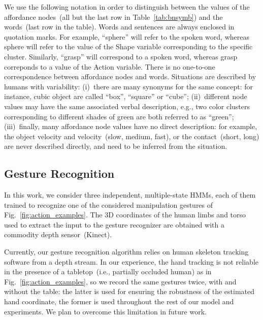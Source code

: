 We use the following notation in order to distinguish between the values of the affordance nodes~(all but the last row in Table~\ref{tab:bnsymb}) and the words~(last row in the table).
Words and sentences are always enclosed in quotation marks.
For example, ``sphere'' will refer to the spoken word, whereas sphere will refer to the value of the Shape variable corresponding to the specific cluster.
Similarly, ``grasp'' will correspond to a spoken word, whereas grasp correponds to a value of the Action variable.
There is no one-to-one correspondence between affordance nodes and words.
Situations are described by humans with variability:
(i)~there are many synonyms for the same concept: for instance, cubic object are called ``box'', ``square'' or ``cube'';
(ii)~different node values may have the same associated verbal description, e.g., two color clusters corresponding to different shades of green are both referred to as ``green'';
(iii)~finally, many affordance node values have no direct description: for example, the object velocity and \objecthand{} velocity~(slow, medium, fast), or the \objecthand{} contact~(short, long) are never described directly, and need to be inferred from the situation.

\subsection{Gesture Recognition}
\label{sec:experimental_settings:gesture_recognition}
In this work, we consider three independent, multiple-state \aclp{HMM}, each of them trained to recognize one of the considered manipulation gestures of  Fig.~\ref{fig:action_examples}.
The 3D coordinates of the human limbs and torso used to extract the input to the gesture recognizer are obtained with a commodity depth sensor~(Kinect).

Currently, our gesture recognition algorithm relies on human skeleton tracking software from a depth stream.
In our experience, the hand tracking is not reliable in the presence of a tabletop~(i.e., partially occluded human) as in Fig.~\ref{fig:action_examples}, so we record the same gestures twice, with and without the table: the latter is used for ensuring the robustness of the estimated hand coordinate, the former is used throughout the rest of our model and experiments.
We plan to overcome this limitation in future work.
